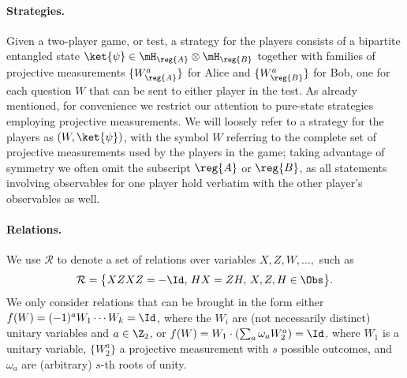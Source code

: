 \paragraph{Strategies.} Given a two-player game, or test, a strategy for the players consists of a bipartite entangled state $\ket{\psi} \in \mH_\reg{A} \otimes \mH_\reg{B}$ together with families of projective  measurements $\{W^a_\reg{A}\}$ for Alice and $\{W_\reg{B}^a\}$ for Bob, one for each question $W$ that can be sent to either player in the test. As already mentioned, for convenience we restrict our attention to pure-state strategies employing projective measurements. 
We will loosely refer to a strategy for the players as $(W,\ket{\psi})$, with the symbol $W$ referring to the complete set of projective measurements used by the players in the game; taking advantage of  symmetry we often omit the subscript $\reg{A}$ or $\reg{B}$, as all statements involving observables for one player hold verbatim with the other player's observables as well. 

\paragraph{Relations.}
We use $\mathcal{R}$ to denote a set of relations over variables $X,Z,W,\ldots,$ such as
$$\mathcal{R}=\big\{XZXZ=-\Id,\, HX=ZH,\,X,Z,H\in\Obs\big\}.$$
We only consider relations that can be brought in the form either $f(W) = (-1)^a W_1\cdots W_k = \Id$, where the $W_i$ are (not necessarily distinct) unitary variables and $a\in\Z_2$, or $f(W) = W_1 \cdot ( \sum_a \omega_a W_2^a)=\Id$, where $W_1$ is a unitary variable, $\{W_2^a\}$ a projective measurement with $s$ possible outcomes, and $\omega_a$ are (arbitrary) $s$-th roots of unity.   

